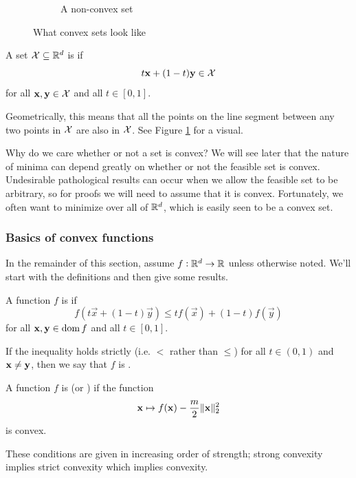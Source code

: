 \begin{figure}
\begin{subfigure}[b]{0.45\linewidth}
    \caption{A non-convex set}
  \end{subfigure}
  \caption{What convex sets look like}
  \label{fig:convexset}
\end{figure}

A set $\mathcal{X} \subseteq \mathbb{R}^d$ is  if
\[t\mathbf{x} + (1-t)\mathbf{y} \in \mathcal{X}\]
for all $\mathbf{x}, \mathbf{y} \in \mathcal{X}$ and all $t \in [0,1]$.

Geometrically, this means that all the points on the line segment between any two points in $\mathcal{X}$ are also in $\mathcal{X}$.
See Figure \ref{fig:convexset} for a visual.

Why do we care whether or not a set is convex?
We will see later that the nature of minima can depend greatly on whether or not the feasible set is convex.
Undesirable pathological results can occur when we allow the feasible set to be arbitrary, so for proofs we will need to assume that it is convex.
Fortunately, we often want to minimize over all of $\mathbb{R}^d$, which is easily seen to be a convex set.

\subsubsection{Basics of convex functions}
In the remainder of this section, assume $f : \mathbb{R}^d \to \mathbb{R}$ unless otherwise noted. We'll start with the definitions and then give some results.

A function $f$ is  if
\[f(t\vec{x} + (1-t)\vec{y}) \leq t f(\vec{x}) + (1-t)f(\vec{y})\]
for all $\mathbf{x}, \mathbf{y} \in \operatorname*{dom} f$ and all $t \in [0,1]$.

If the inequality holds strictly (i.e. $<$ rather than $\leq$) for all $t \in (0,1)$ and $\mathbf{x} \neq \mathbf{y}$, then we say that $f$ is .

A function $f$ is  (or ) if the function
\[\mathbf{x} \mapsto f(\mathbf{x}) - \frac{m}{2}\|\mathbf{x}\|_2^2\]
is convex.

These conditions are given in increasing order of strength; strong convexity implies strict convexity which implies convexity.

